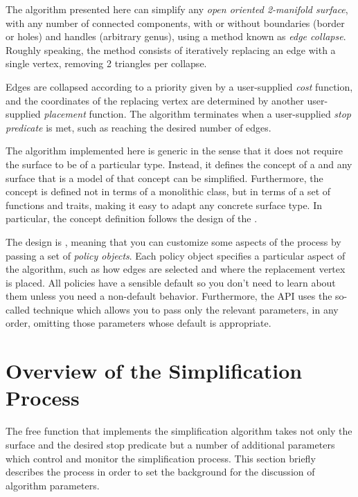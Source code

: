 The algorithm presented here can simplify any {\em open oriented 2-manifold surface},
with any number of connected components, with or without boundaries (border or holes) 
and handles (arbitrary genus), using a method known as {\em edge collapse}.\\
Roughly speaking, the method consists of iteratively replacing an edge with a single vertex, 
removing 2 triangles per collapse.


Edges are collapsed according to a priority given by a user-supplied {\em cost} function,
and the coordinates of the replacing vertex are determined by another user-supplied
{\em placement} function. The algorithm terminates when a user-supplied {\em stop predicate} 
is met, such as reaching the desired number of edges.

The algorithm implemented here is generic in the sense that it does not require the surface 
to be of a particular type. Instead, it defines the concept of a 
and any surface that is a model of that concept can be simplified. Furthermore, the concept
is defined not in terms of a monolithic class, but in terms of a set of functions and traits,
making it easy to adapt any concrete surface type. In particular, the concept definition 
follows the design of the 
.

The design is ,
meaning that you can customize some aspects of the process by passing a set of
{\em policy objects}. Each policy object specifies a particular aspect of the algorithm,
such as how edges are selected and where the replacement vertex is placed. All policies have 
a sensible default so you don't need to learn about them unless you need a non-default behavior.
Furthermore, the API uses the so-called  technique which allows you
to pass only the relevant parameters, in any order, omitting those parameters whose
default is appropriate.

\section{Overview of the Simplification Process}

The free function that implements the simplification algorithm takes not only the surface
and the desired stop predicate but a number of additional parameters which control and
monitor the simplification process. This section briefly describes the process in order 
to set the background for the discussion of algorithm parameters.

